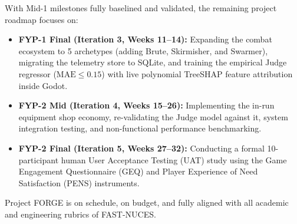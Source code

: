 With Mid-1 milestones fully baselined and validated, the remaining project roadmap focuses on:
\begin{itemize}
    \item \textbf{FYP-1 Final (Iteration 3, Weeks 11--14):} Expanding the combat ecosystem to 5 archetypes (adding Brute, Skirmisher, and Swarmer), migrating the telemetry store to SQLite, and training the empirical Judge regressor ($\text{MAE} \le 0.15$) with live polynomial TreeSHAP feature attribution inside Godot.
    \item \textbf{FYP-2 Mid (Iteration 4, Weeks 15--26):} Implementing the in-run equipment shop economy, re-validating the Judge model against it, system integration testing, and non-functional performance benchmarking.
    \item \textbf{FYP-2 Final (Iteration 5, Weeks 27--32):} Conducting a formal 10-participant human User Acceptance Testing (UAT) study using the Game Engagement Questionnaire (GEQ) and Player Experience of Need Satisfaction (PENS) instruments.
\end{itemize}
Project FORGE is on schedule, on budget, and fully aligned with all academic and engineering rubrics of FAST-NUCES.
